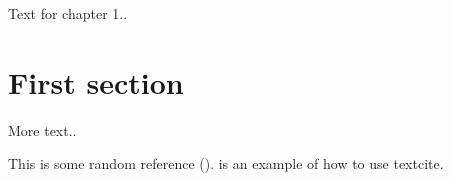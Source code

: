 
Text for chapter 1..

\section{First section }

More text..

This is some random reference (\cite{sanchez2011introduction}). \textcite{parish2009propagation} is an example of how to use textcite.